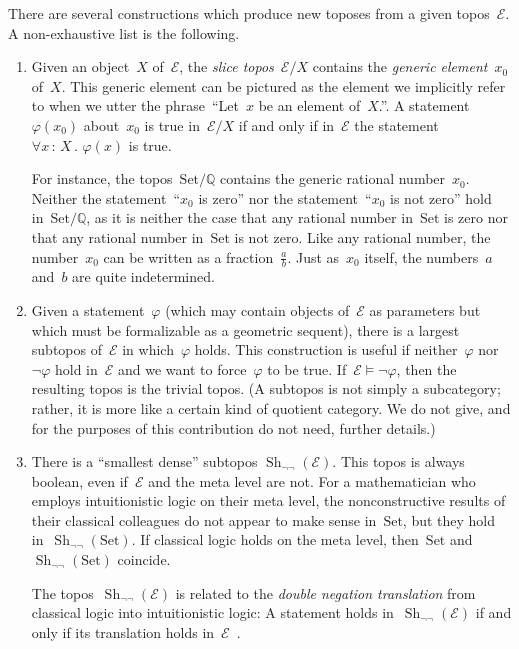 \documentclass[graybox]{svmult}
\renewcommand{\E}{\mathcal{E}}
\newcommand{\QQ}{\mathbb{Q}}
\DeclareMathOperator{\Sh}{Sh}
\newcommand{\Set}{\mathrm{Set}}
\renewcommand{\_}{\mathpunct{.}\,}
\newcommand{\?}{\,{:}\,}
\begin{document}
There are several constructions which produce new toposes from a given
topos~$\E$. A non-exhaustive list is the following.
\begin{enumerate}
\item Given an object~$X$ of~$\E$, the \emph{slice topos}~$\E/X$
contains the \emph{generic element}~$x_0$ of~$X$. This generic element can be
pictured as the element we implicitly refer to when we utter the
phrase~``Let~$x$ be an element of~$X$.''. A statement~$\varphi(x_0)$
about~$x_0$ is true in~$\E/X$ if and only if in~$\E$ the statement~$\forall x
\? X\_ \varphi(x)$ is true.

For instance, the topos~$\Set/\QQ$ contains the generic rational number~$x_0$.
Neither the statement~``$x_0$ is zero'' nor the statement~``$x_0$ is not zero''
hold in~$\Set/\QQ$, as it is neither the case that any rational number
in~$\Set$ is zero nor that any rational number in~$\Set$ is not zero. Like any
rational number, the number~$x_0$ can be written as a fraction~$\frac{a}{b}$.
Just as~$x_0$ itself, the numbers~$a$ and~$b$ are quite indetermined.
\item Given a statement~$\varphi$ (which may contain objects of~$\E$ as
parameters but which must be formalizable as a geometric sequent), there is a
largest subtopos of~$\E$ in which~$\varphi$ holds. This construction is useful
if neither~$\varphi$ nor~$\neg\varphi$ hold in~$\E$ and we want to
force~$\varphi$ to be true. If~$\E \models \neg\varphi$, then the resulting
topos is the trivial topos. (A subtopos is not simply a subcategory; rather, it
is more like a certain kind of quotient category. We do not give, and for the
purposes of this contribution do not need, further details.)
\item There is a ``smallest dense'' subtopos $\Sh_{\neg\neg}(\E)$. This topos
is always boolean, even if~$\E$ and the meta level are not. For a mathematician who employs
intuitionistic logic on their meta level, the nonconstructive results of their
classical colleagues do not appear to make sense in~$\Set$, but they hold
in~$\Sh_{\neg\neg}(\Set)$. If classical logic holds on the meta level,
then~$\Set$ and~$\Sh_{\neg\neg}(\Set)$ coincide.

The topos~$\Sh_{\neg\neg}(\E)$ is related to the \emph{double negation
translation} from classical logic into
intuitionistic logic: A statement holds in~$\Sh_{\neg\neg}(\E)$ if
and only if its translation holds
in~$\E$~\cite[Theorem~6.31]{blechschmidt:phd}.
\end{enumerate}
\end{document}
